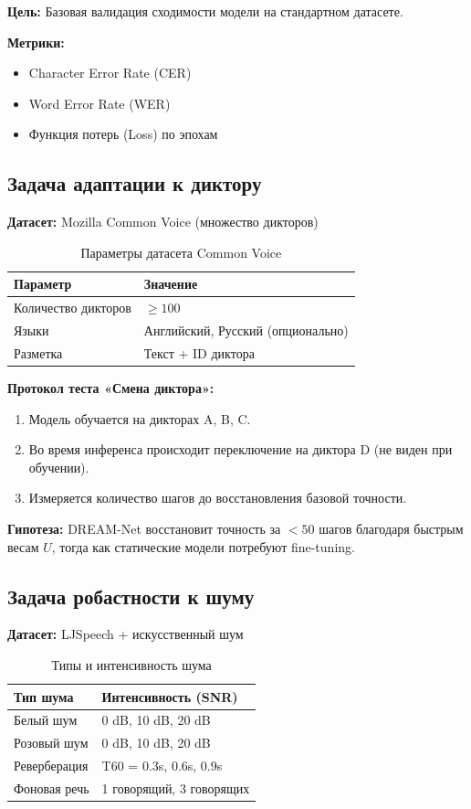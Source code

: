 \textbf{Цель:} Базовая валидация сходимости модели на стандартном датасете.

\textbf{Метрики:}
\begin{itemize}
    \item Character Error Rate (CER)
    \item Word Error Rate (WER)
    \item Функция потерь (Loss) по эпохам
\end{itemize}

\subsection{Задача адаптации к диктору}

\textbf{Датасет:} Mozilla Common Voice (множество дикторов)

\begin{table}[h]
\centering
\caption{Параметры датасета Common Voice}
\label{tab:commonvoice}
\begin{tabular}{lp{8cm}}
\toprule
\textbf{Параметр} & \textbf{Значение} \\
\midrule
Количество дикторов & $\geq 100$ \\
Языки & Английский, Русский (опционально) \\
Разметка & Текст + ID диктора \\
\bottomrule
\end{tabular}
\end{table}

\textbf{Протокол теста «Смена диктора»:}
\begin{enumerate}
    \item Модель обучается на дикторах A, B, C.
    \item Во время инференса происходит переключение на диктора D (не виден при обучении).
    \item Измеряется количество шагов до восстановления базовой точности.
\end{enumerate}

\textbf{Гипотеза:} DREAM-Net восстановит точность за $< 50$ шагов благодаря быстрым весам $U$, тогда как статические модели потребуют fine-tuning.

\subsection{Задача робастности к шуму}

\textbf{Датасет:} LJSpeech + искусственный шум

\begin{table}[h]
\centering
\caption{Типы и интенсивность шума}
\label{tab:noise}
\begin{tabular}{lp{6cm}}
\toprule
\textbf{Тип шума} & \textbf{Интенсивность (SNR)} \\
\midrule
Белый шум & 0 dB, 10 dB, 20 dB \\
Розовый шум & 0 dB, 10 dB, 20 dB \\
Реверберация & T60 = 0.3s, 0.6s, 0.9s \\
Фоновая речь & 1 говорящий, 3 говорящих \\
\bottomrule
\end{tabular}
\end{table}

